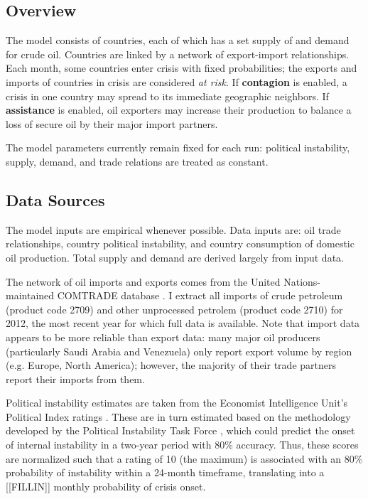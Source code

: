 \documentclass{article}
\begin{document}
\subsection{Overview}

The model consists of countries, each of which has a set supply of and demand for crude oil. Countries are linked by a network of export-import relationships. Each month, some countries enter crisis with fixed probabilities; the exports and imports of countries in crisis are considered \emph{at risk}. If \textbf{contagion} is enabled, a crisis in one country may spread to its immediate geographic neighbors. If \textbf{assistance} is enabled, oil exporters may increase their production to balance a loss of secure oil by their major import partners.

The model parameters currently remain fixed for each run: political instability, supply, demand, and trade relations are treated as constant. 

\subsection{Data Sources}
The model inputs are empirical whenever possible. Data inputs are: oil trade relationships, country political instability, and country consumption of domestic oil production. Total supply and demand are derived largely from input data.

The network of oil imports and exports comes from the United Nations-maintained COMTRADE database \citep{un_2013}. I extract all imports of crude petroleum (product code 2709) and other unprocessed petrolem (product code 2710) for 2012, the most recent year for which full data is available. Note that import data appears to be more reliable than export data: many major oil producers (particularly Saudi Arabia and Venezuela) only report export volume by region (e.g. Europe, North America); however, the majority of their trade partners report their imports from them.

Political instability estimates are taken from the Economist Intelligence Unit's Political Index ratings \citep{eiu_2013}. These are in turn estimated based on the methodology developed by the Political Instability Task Force \citep{goldstone_2005}, which could predict the onset of internal instability in a two-year period with 80\% accuracy. Thus, these scores are normalized such that a rating of 10 (the maximum) is associated with an 80\% probability of instability within a 24-month timeframe, translating into a [[FILLIN]] monthly probability of crisis onset.
\end{document}
